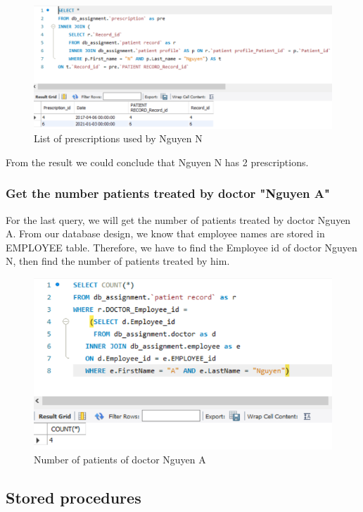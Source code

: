 \begin{figure}[H]
    \centering
    \includegraphics[width = 12cm]{assets/query_2.png}
    \captionsetup{justification=centering,margin=2cm}
    \caption{List of prescriptions used by Nguyen N}
\end{figure}

From the result we could conclude that Nguyen N has 2 prescriptions.

\subsubsection{Get the number patients treated by doctor "Nguyen A"}

For the last query, we will get the number of patients treated by doctor Nguyen A. From our database design, we know that employee names are stored in EMPLOYEE table. Therefore, we have to find the Employee id of doctor Nguyen N, then find the number of patients treated by him.

\begin{figure}[H]
    \centering
    \includegraphics[width = 12cm]{assets/query_3a.png}
    \captionsetup{justification=centering,margin=2cm}
    \caption{Number of patients of doctor Nguyen A}
\end{figure}

\subsection{Stored procedures}

